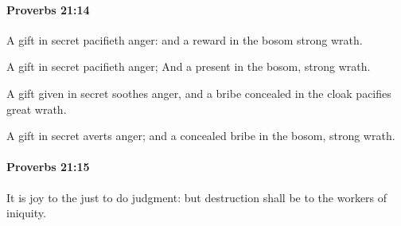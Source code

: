 		\paragraph{Proverbs 21:14} %
			\label{PROVERBS-21-14}

			A gift in secret pacifieth anger: and a reward in the bosom strong wrath.

			\begin{versebox}
					\item[BHS] 
					\item[ASV] A gift in secret pacifieth anger; And a present in the bosom, strong wrath.
					\item[NIV] A gift given in secret soothes anger, and a bribe concealed in the cloak pacifies great wrath.
					\item[NRSV] A gift in secret averts anger; and a concealed bribe in the bosom, strong wrath.
			\end{versebox}

		\paragraph{Proverbs 21:15} %
			\label{PROVERBS-21-15}

			It is joy to the just to do judgment: but destruction shall be to the workers of iniquity.

